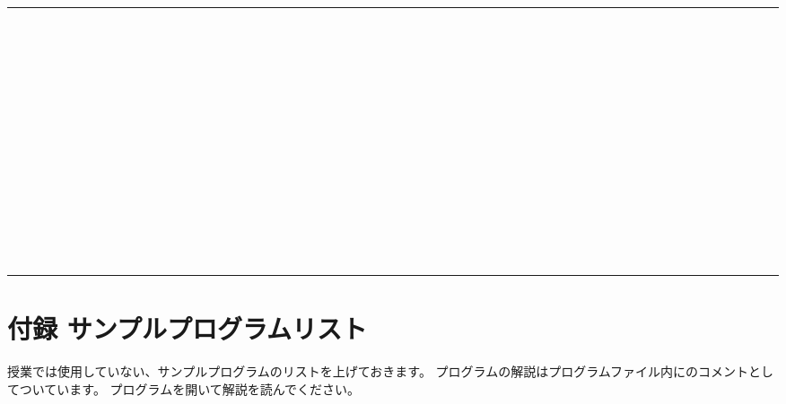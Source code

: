\begin{table}[htbp]
\begin{tabular}{|l|}
        　　　　　　　　　　　　　　　　　　　　　　　　　　　　　　　　　　　　　　　　　　　　　　　　　　　　　　　　　　　　　　　　\\
        　　　　　　　　　　　　　　　　　　　　　　　　　　　　　　　　　　　　　　　　　　　　　　　　　　　　　　　　　　　　　　　　\\
        　　　　　　　　　　　　　　　　　　　　　　　　　　　　　　　　　　　　　　　　　　　　　　　　　　　　　　　　　　　　　　　　\\
        　　　　　　　　　　　　　　　　　　　　　　　　　　　　　　　　　　　　　　　　　　　　　　　　　　　　　　　　　　　　　　　　\\
        　　　　　　　　　　　　　　　　　　　　　　　　　　　　　　　　　　　　　　　　　　　　　　　　　　　　　　　　　　　　　　　　\\
        　　　　　　　　　　　　　　　　　　　　　　　　　　　　　　　　　　　　　　　　　　　　　　　　　　　　　　　　　　　　　　　　\\
        　　　　　　　　　　　　　　　　　　　　　　　　　　　　　　　　　　　　　　　　　　　　　　　　　　　　　　　　　　　　　　　　\\
        　　　　　　　　　　　　　　　　　　　　　　　　　　　　　　　　　　　　　　　　　　　　　　　　　　　　　　　　　　　　　　　　\\
        　　　　　　　　　　　　　　　　　　　　　　　　　　　　　　　　　　　　　　　　　　　　　　　　　　　　　　　　　　　　　　　　\\
        　　　　　　　　　　　　　　　　　　　　　　　　　　　　　　　　　　　　　　　　　　　　　　　　　　　　　　　　　　　　　　　　\\
        　　　　　　　　　　　　　　　　　　　　　　　　　　　　　　　　　　　　　　　　　　　　　　　　　　　　　　　　　　　　　　　　\\
        　　　　　　　　　　　　　　　　　　　　　　　　　　　　　　　　　　　　　　　　　　　　　　　　　　　　　　　　　　　　　　　　\\
        \hline
    \end{tabular}
\end{table}



\bigskip

\clearpage\section{付録
サンプルプログラムリスト}
授業では使用していない、サンプルプログラムのリストを上げておきます。
プログラムの解説はプログラムファイル内にのコメントとしてついています。
プログラムを開いて解説を読んでください。

